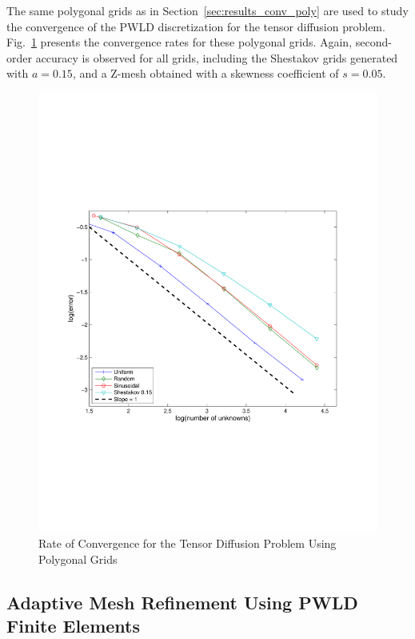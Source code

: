\documentclass[preprint,10pt]{elsarticle}
\newcommand{\fig}[1]{Fig.~\ref{#1}}                      %
\newcommand{\sct}[1]{Section~\ref{#1}}                   %
\begin{document}
The same polygonal grids as in \sct{sec:results_conv_poly} are used to study the convergence of the PWLD discretization
for the tensor diffusion problem. 
\fig{fig:conv_rate_tens} presents the convergence rates for these polygonal grids. Again, second-order accuracy 
is observed for all grids, including the Shestakov grids generated with $a=0.15$, and a Z-mesh obtained with a skewness 
coefficient of $s=0.05$.

\begin{figure}[!hbtp]
\centering
\includegraphics[scale=0.5]{../pwld_diffusion/results/tensor/cv_tens}
\caption{Rate of Convergence for the Tensor Diffusion Problem Using Polygonal Grids}
\label{fig:conv_rate_tens}
\end{figure}
 
\subsection{Adaptive Mesh Refinement Using PWLD Finite Elements} \label{sec:results_conv_amr}
\end{document}
